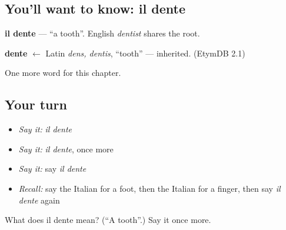 \subsection*{You'll want to know: il dente}
\textbf{il dente} — \textquotedblleft{}a tooth\textquotedblright{}. English \emph{dentist} shares the root.

\begin{cousinweb}
\textbf{dente} $\leftarrow$ Latin \emph{dens, dentis}, \textquotedblleft{}tooth\textquotedblright{} — inherited. (EtymDB 2.1)
\end{cousinweb}

\begin{grammarlens}[title={What you've built}]
One more word for this chapter.
\end{grammarlens}

\subsection*{Your turn}
\begin{itemize}
\raggedright
  \item \emph{Say it:} \emph{il dente}
  \item \emph{Say it:} \emph{il dente}, once more
  \item \emph{Say it:} say \emph{il dente}
  \item \emph{Recall:} say the Italian for a foot, then the Italian for a finger, then say \emph{il dente} again
\end{itemize}

\begin{tcolorbox}[breakable,colback=teal!4,colframe=teal!35!black,title={Before you move on}]
What does il dente mean? (\textquotedblleft{}A tooth\textquotedblright{}.) Say it once more.
\end{tcolorbox}
